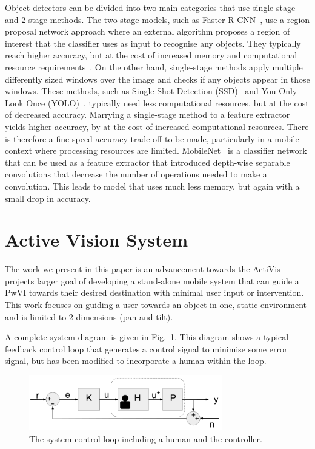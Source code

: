 \documentclass[runningheads]{llncs}
\begin{document}
Object detectors can be divided into two main categories that use single-stage and 2-stage methods.  
The two-stage models, such as Faster R-CNN~\cite{ren2015faster}, use a region proposal network approach where an external algorithm proposes a region of interest that the classifier uses as input to recognise any objects. 
They typically reach higher accuracy, but at the cost of increased memory and computational resource requirements~\cite{liu2018deeplf}.
On the other hand, single-stage methods apply multiple differently sized windows over the image and checks if any objects appear in those windows. 
These methods, such as Single-Shot Detection (SSD)~\cite{liu2016ssd} and You Only Look Once (YOLO)~\cite{redmon2018yolo}, typically need less computational resources, but at the cost of decreased accuracy.
Marrying a single-stage method to a feature extractor yields higher accuracy, by at the cost of increased computational resources. 
There is therefore a fine speed-accuracy trade-off to be made, particularly in a mobile context where processing resources are limited. 
MobileNet~\cite{howard2017mobilenet} is a classifier network that can be used as a feature extractor  that introduced depth-wise separable convolutions that decrease the number of operations needed to make a convolution.
This leads to model that uses much less memory, but again with a small drop in accuracy.

\section{Active Vision System}\label{sec:active-vision}

The work we present in this paper is an advancement towards the ActiVis projects larger goal of developing a stand-alone mobile system that can guide a PwVI towards their desired destination with minimal user input or intervention. 
This work focuses on guiding a user towards an object in one, static environment and is limited to 2 dimensions (pan and tilt).

A complete system diagram is given in Fig.~\ref{fig:sys-diagram}. 
This diagram shows a typical feedback control loop that generates a control signal to minimise some error signal, but has been modified to incorporate a human within the loop.

\begin{figure}
  \centering
  \includegraphics[width=0.75\textwidth]{figures/control_loop.png}
  \caption{The system control loop including a human and the controller.}\label{fig:sys-diagram}
\end{figure}
\end{document}

